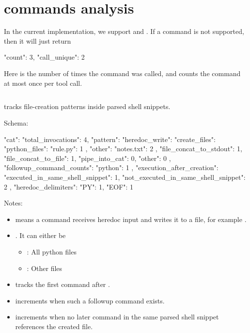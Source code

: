 \documentclass[11pt]{article}
\begin{document}
\section*{commands analysis}

In the current implementation, we support  and .
If a command is not supported, then it will just return
\begin{DocCode}
{"count": 3, "call_unique": 2}
\end{DocCode}
Here  is the number of times the command was called, and  counts the command at most once per tool call.

\subsection*{}

 tracks file-creation patterns inside parsed shell snippets.

Schema:

\begin{DocCode}
{
  "cat": {
    "total_invocations": 4,
    "pattern": {
      "heredoc_write": {
        "create_files": {
          "python_files": {
            "rule.py": 1
          },
          "other": {
            "notes.txt": 2
          }
        }
      },
      "file_concat_to_stdout": 1,
      "file_concat_to_file": 1,
      "pipe_into_cat": 0,
      "other": 0
    },
    "followup_command_counts": {
      "python": 1
    },
    "execution_after_creation": {
      "executed_in_same_shell_snippet": 1,
      "not_executed_in_same_shell_snippet": 2
    },
    "heredoc_delimiters": {
      "PY": 1,
      "EOF": 1
    }
  }
}
\end{DocCode}

Notes:
\begin{itemize}
\item {} means a  command receives heredoc input and writes it to a file, for example .
\item {}. It can either be
\begin{itemize}
  \item {}: All python files
  \item {}: Other files
\end{itemize}
\item {} tracks the first command after .
\item {} increments when such a followup command exists.
\item {} increments when no later command in the same parsed shell snippet references the created file.
\end{itemize}
\end{document}
